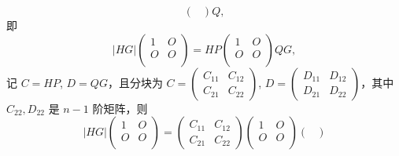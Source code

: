\begin{exercise}
\begin{exgroup}
\begin{answer}
\begin{enumerate}
\begin{enumerate}
\[\begin{pmatrix}
                                    \end{pmatrix}Q,\]
                                即
                                \[\lvert HG \rvert\begin{pmatrix}
                                        1 & O \\
                                        O & O \\
                                    \end{pmatrix} = HP\begin{pmatrix}
                                        1 & O \\
                                        O & O \\
                                    \end{pmatrix}QG,\]
                                记 $C = HP$, $D = QG$，且分块为 $C = \begin{pmatrix}
                                        C_{11} & C_{12} \\
                                        C_{21} & C_{22}
                                    \end{pmatrix}$, $D = \begin{pmatrix}
                                        D_{11} & D_{12} \\
                                        D_{21} & D_{22}
                                    \end{pmatrix}$，其中 $C_{22}, D_{22}$ 是 $n-1$ 阶矩阵，则
                                \[\lvert HG \rvert\begin{pmatrix}
                                        1 & O \\
                                        O & O \\
                                    \end{pmatrix} = \begin{pmatrix}
                                        C_{11} & C_{12} \\
                                        C_{21} & C_{22}
                                    \end{pmatrix} \begin{pmatrix}
                                        1 & O \\
                                        O & O \\
                                    \end{pmatrix} \begin{pmatrix}

\end{pmatrix}\]
\end{enumerate}
\end{enumerate}
\end{answer}
\end{exgroup}
\end{exercise}

